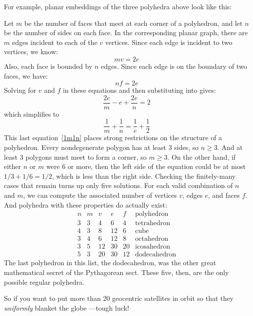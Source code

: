 For example, planar embeddings of the three polyhedra above look like
this:

\begin{center}

\end{center}

Let $m$ be the number of faces that meet at each corner of a
polyhedron, and let $n$ be the number of sides on each face.  In the
corresponding planar graph, there are $m$ edges incident to each of
the $v$ vertices.  Since each edge is incident to two vertices, we
know:
%
\[
m v = 2 e
\]
%
Also, each face is bounded by $n$ edges.  Since each edge is on the
boundary of two faces, we have:
%
\[
n f = 2 e
\]
%
Solving for $v$ and $f$ in these equations and then substituting into
 gives:
\[
\frac{2e}{m} - e + \frac{2e}{n} = 2
\]
which simplifies to
\begin{equation}\label{1m1n}
\frac{1}{m} + \frac{1}{n} = \frac{1}{e} + \frac{1}{2}
\end{equation}
%
This last equation~\eqref{1m1n} places strong restrictions on the
structure of a polyhedron.  Every nondegenerate polygon has at least 3
sides, so $n \geq 3$.  And at least 3 polygons must meet to form a corner,
so $m \geq 3$.  On the other hand, if either $n$ or $m$ were 6 or more,
then the left side of the equation could be at most $1/3 + 1/6 = 1/2$,
which is less than the right side.  Checking the finitely-many cases that
remain turns up only five solutions.  For each valid combination of $n$
and $m$, we can compute the associated number of vertices $v$, edges $e$,
and faces $f$.  And polyhedra with these properties do actually exist:
%
\[
\begin{array}{cc|ccc|l}
n & m & v  & e  &  f & \text{polyhedron} \\ \hline
3 & 3 & 4  & 6  &  4 & \text{tetrahedron} \\
4 & 3 & 8  & 12 &  6 & \text{cube} \\
3 & 4 & 6  & 12 &  8 & \text{octahedron} \\
3 & 5 & 12 & 30 & 20 & \text{icosahedron} \\
5 & 3 & 20 & 30 & 12 & \text{dodecahedron}
\end{array}
\]
%
The last polyhedron in this list, the dodecahedron, was the other great
mathematical secret of the Pythagorean sect.  These five, then, are the
only possible regular polyhedra.

So if you want to put more than 20 geocentric satellites in orbit so that
they \emph{uniformly} blanket the globe ---tough luck!


